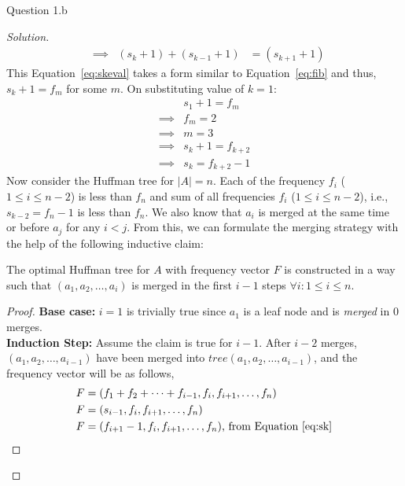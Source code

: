 \begin{solution}{Question 1.b}
\begin{proof}[Solution]
\begin{equation}
\begin{alignedat}{4}
                &\implies &(s_k+1)+(s_{k-1}+1) &=(s_{k+1}+1)
            \end{alignedat}
        \end{equation}
        This Equation~\ref{eq:skeval} takes a form similar to Equation~\ref{eq:fib} and thus, $s_k+1=f_m$ for some $m$. On substituting value of $k=1$:
        \begin{equation}\label{eq:sk}
            \begin{split}
                &s_1+1=f_m\\
                \implies &f_m=2\\
                \implies &m=3\\
                \implies &s_k+1=f_{k+2}\\
                \implies &s_k=f_{k+2}-1
            \end{split}
        \end{equation}
        Now consider the Huffman tree for $|A|=n$. Each of the frequency $f_i$ ($1\leq i\leq n-2$) is less than $f_n$ and sum of all frequencies $f_i$ ($1\leq i\leq n-2$), i.e., $s_{k-2}=f_n-1$ is less than $f_n$. We also know that $a_i$ is merged at the same time or before $a_j$ for any $i<j$. From this, we can formulate the merging strategy with the help of the following inductive claim:
        \begin{claim}\label{claim:moves}
            The optimal Huffman tree for $A$ with frequency vector $F$ is constructed in a way such that $(a_1, a_2, \ldots, a_i)$ is merged in the first $i-1$ steps $\forall i: 1\leq i\leq n$.
        \end{claim}
        \begin{proof}
            \textbf{Base case:} $i=1$ is trivially true since $a_1$ is a leaf node and is \textit{merged} in $0$ merges.\\
            \textbf{Induction Step:} Assume the claim is true for $i-1$. After $i-2$ merges, $(a_1, a_2, \ldots, a_{i-1})$ have been merged into $tree(a_1, a_2, \ldots, a_{i-1})$, and the frequency vector will be as follows,
            \begin{equation}
                \begin{split}
                    F &= \left(f_1+f_2+\cdots+f_{i-1}, f_i, f_{i+1}, \ldots, f_n\right)\\
                    F &= (s_{i-1}, f_i, f_{i+1}, \ldots, f_n)\\
                    F &= (f_{i+1}-1, f_i, f_{i+1}, \ldots, f_n)\text{, from Equation~\ref{eq:sk}}

\end{split}
\end{equation}
\end{proof}
\end{proof}
\end{solution}
